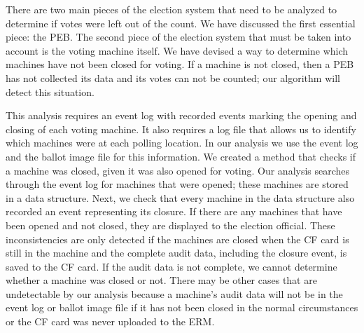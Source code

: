 There are two main pieces of the election system that need to be
analyzed to determine if votes were left out of the count.  We have
discussed the first essential piece: the PEB.  The second piece of the
election system that must be taken into account is the voting machine
itself.   We have devised a way to determine which machines have not
been closed for voting.  If a machine is not closed, then a PEB has
not collected its data and its votes can not be counted; our algorithm
will  detect this situation.   

This analysis requires an event log with recorded events marking the
opening and closing of each voting machine. It also requires a log
file that allows us to identify which machines were at each polling
location. In our analysis we use the event log and the ballot image
file for this information. We created a method that checks if a
machine was closed, given it was also opened for voting.  Our analysis
searches through the event log for machines that were opened; these
machines are stored in a data structure.  Next, we check that every
machine in the data structure also recorded an event representing its
closure.  If there are any machines that have been opened and not
closed, they are displayed to the election official.  These
inconsistencies are only detected if the machines are closed when the
CF card is still in the machine and the complete audit data, including
the closure event, is saved to the CF card.  If the audit data is not
complete, we cannot determine whether a machine was closed or not.
There may be other cases that are undetectable by our analysis because
a machine's audit data will not be in the event log or ballot image
file if it has not been closed in the normal circumstances or the CF
card was never uploaded to the ERM.  
